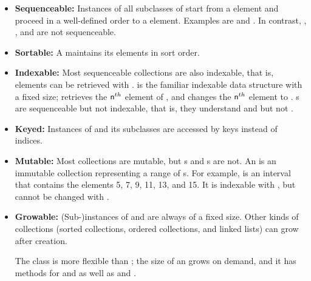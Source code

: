 \documentclass[a4paper,10pt,twoside]{book}
\begin{document}
\begin{itemize}
  \item {\bf Sequenceable:}
  Instances of all subclasses of  start from a  element and proceed in a well-defined order to a  element. Examples are  and .
  In contrast, , , and  are not sequenceable.

  \item {\bf Sortable:}
  A  maintains its elements in sort order.

  \item {\bf Indexable:}
	Most sequenceable collections are also indexable, that is, elements can be retrieved with .
	 is the familiar indexable data structure with a fixed size;  retrieves the $\mbox{\ct{n}}^{th}$ element of , and  changes the $\mbox{\ct{n}}^{th}$ element to .
	s are sequenceable but not indexable, that is, they understand  and  but not .

  \item {\bf Keyed:}
	Instances of  and its subclasses are accessed by keys instead of indices.

  \item {\bf Mutable:}
  	Most collections are mutable, but s and s are not.
  An  is an immutable collection representing a range of s.
  For example,  is an interval that contains the elements 5, 7, 9, 11, 13, and 15.
  It is indexable with , but cannot be changed with .

  \item {\bf Growable:}
    (Sub-)instances of  and  are always of a fixed size.
    Other kinds of collections (sorted collections, ordered collections, and linked lists) can grow after creation.

	The class  is more flexible than ; the size of an  grows on demand, and it has methods for  and  as well as  and .


\end{itemize}
\end{document}
